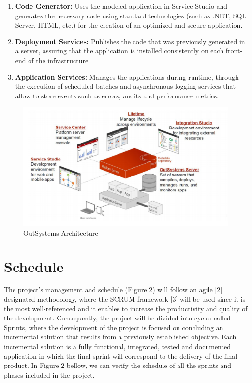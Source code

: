\documentclass[a4paper,openright,12pt]{report}
\begin{document}
\begin{enumerate}
\item \textbf{Code Generator:} Uses the modeled application in Service Studio and generates the necessary code using standard technologies (such as .NET, SQL Server, HTML, etc.) for the creation of an optimized and secure application.
\item \textbf{ Deployment Services:} Publishes the code that was previously generated in a server, assuring that the application is installed consistently on each front-end of the infrastructure.
\item  \textbf{Application Services:} Manages the applications during runtime, through the execution of scheduled batches and asynchronous logging services that allow to store events such as errors, audits and performance metrics.
\end{enumerate}

\begin{figure}[H]
  \includegraphics[width=\linewidth]{./figures/Architecture.png}
  \caption{OutSystems Architecture}\label{fig:architecture}
\end{figure}

\section*{Schedule} 

The project's management and schedule (Figure 2) will follow an agile [2] designated methodology, 
where the SCRUM framework [3] will be used since it is the most well-referenced and it enables to 
increase the productivity and quality of the development. 
Consequently, the project will be divided into cycles called Sprints, 
where the development of the project is focused on concluding an incremental solution that results 
from a previously established objective. Each incremental solution  is a fully functional, integrated, 
tested and documented application in which the final sprint will correspond to the delivery of the final product. 
In Figure 2 bellow, we can verify the schedule of all the sprints and phases included in the project.
\end{document}
